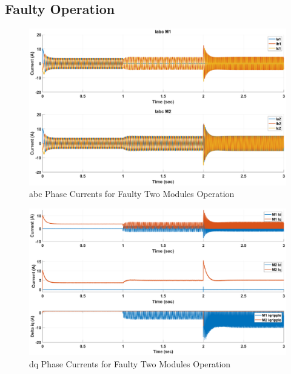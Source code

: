 \documentclass{article}
\begin{document}
\subsection{Faulty Operation}

\begin{figure}[h!]
\centering
\includegraphics[scale=0.35]{SimulationResults/two_modules/faulty/Iabc.eps}
\caption{abc Phase Currents for Faulty Two Modules Operation}
\label{fig:PhaseCurrentsAbcTwoModulesFaulty}
\end{figure}

\begin{figure}[h!]
\centering
\includegraphics[scale=0.35]{SimulationResults/two_modules/faulty/Idq_iqripple.eps}
\caption{dq Phase Currents for Faulty Two Modules Operation}
\label{fig:PhaseCurrentsDqTwoModulesFaulty}
\end{figure}
\end{document}
